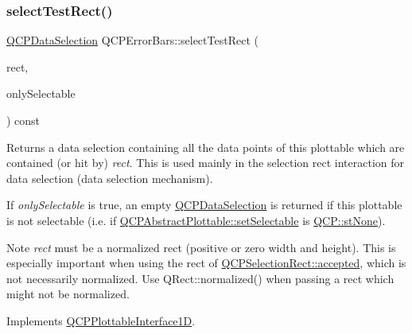 \subsubsection{\texorpdfstring{select\+Test\+Rect()}{selectTestRect()}\hspace{0.1cm}{\footnotesize\ttfamily [2/2]}}
{\footnotesize\ttfamily \hyperlink{class_q_c_p_data_selection}{Q\+C\+P\+Data\+Selection} Q\+C\+P\+Error\+Bars\+::select\+Test\+Rect (\begin{DoxyParamCaption}\item[{const Q\+RectF \&}]{rect,  }\item[{bool}]{only\+Selectable }\end{DoxyParamCaption}) const\hspace{0.3cm}{\ttfamily [virtual]}}





Returns a data selection containing all the data points of this plottable which are contained (or hit by) {\itshape rect}. This is used mainly in the selection rect interaction for data selection (data selection mechanism).

If {\itshape only\+Selectable} is true, an empty \hyperlink{class_q_c_p_data_selection}{Q\+C\+P\+Data\+Selection} is returned if this plottable is not selectable (i.\+e. if \hyperlink{class_q_c_p_abstract_plottable_ac238d6e910f976f1f30d41c2bca44ac3}{Q\+C\+P\+Abstract\+Plottable\+::set\+Selectable} is \hyperlink{namespace_q_c_p_ac6cb9db26a564b27feda362a438db038a2cb7996ccc6c39b9e6d20f2e46bf3f57}{Q\+C\+P\+::st\+None}).

\begin{DoxyNote}{Note}
{\itshape rect} must be a normalized rect (positive or zero width and height). This is especially important when using the rect of \hyperlink{class_q_c_p_selection_rect_a15a43542e1f7b953a44c260b419e6d2c}{Q\+C\+P\+Selection\+Rect\+::accepted}, which is not necessarily normalized. Use {\ttfamily Q\+Rect\+::normalized()} when passing a rect which might not be normalized. 
\end{DoxyNote}


Implements \hyperlink{class_q_c_p_plottable_interface1_d_a67093e4ccf490ff5f7750640941ff34c}{Q\+C\+P\+Plottable\+Interface1D}.

\mbox{\label{class_q_c_p_error_bars_a92b1980003255f5f7c05407a4d92aabc}} 
